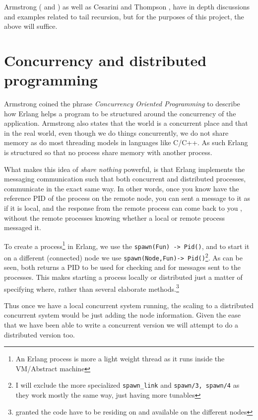 \documentclass[a4paper,11pt]{report}
\begin{document}
 Armstrong
(\cite{thesis:armstrong} and \cite{joe:09}) as well as Cesarini and
Thompson \cite{oreily:Erlang}, have in depth discussions and examples
related to tail recursion, but for the purposes of this project, the
above will suffice.

\section{Concurrency and distributed programming}


Armstrong\cite{thesis:armstrong} coined the phrase
\emph{Concurrency Oriented Programming} to describe how Erlang helps
a program to be structured around the concurrency of the
application. Armstrong\cite{joe:09} also states that the
world is a concurrent place and that in the real world, even though we
do things concurrently, we do not share memory as do most threading
models in languages like C/C++. As such Erlang is
structured so that no process share memory with another process.

What makes this idea of \emph{share nothing} powerful, is that Erlang
implements the messaging communication such that both concurrent
and distributed processes, communicate in the exact same way. In other
words, once you know have the reference PID of the process on the
remote node, you can sent a message to it as if it is local, and the
response from the remote process can come back to you , without the
remote processes knowing whether a local or remote process messaged
it.

To create a process\footnote{An Erlang process is more a light weight
  thread as it runs inside the VM/Abstract machine} in Erlang, we use
the \texttt{spawn(Fun) -> Pid()}, and to start it on a different
(connected) node we use \texttt{spawn(Node,Fun)-> Pid()}\footnote{I
  will exclude the more specialized \texttt{spawn\_link} and
  \texttt{spawn/3, spawn/4} as they work mostly the same way, just
  having more tunables}. As can be seen, both returns a PID to be used
for checking and for messages sent to the processes. This makes
starting a process locally or distributed just a matter of specifying
where, rather than several elaborate methods.\footnote{granted the
  code have to be residing on and available on the different nodes}

Thus once we have a local concurrent system running, the scaling to a
distributed concurrent system would be just adding the node
information. Given the ease that we have been able to write a
concurrent version we will attempt to do a distributed version too.
\end{document}
